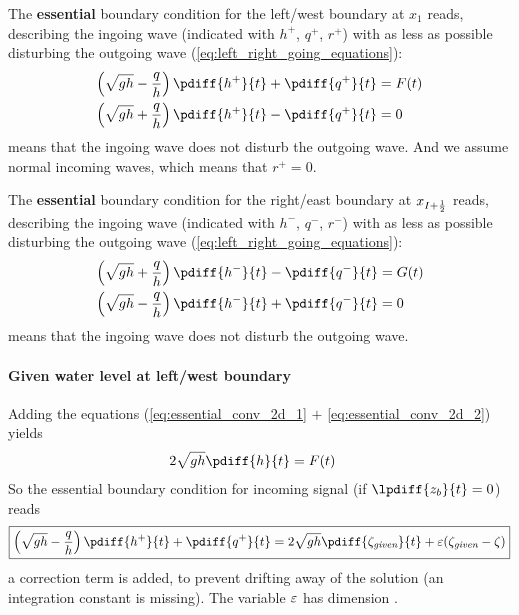 The \textbf{essential} boundary condition for the left/west boundary at $x_{1}$ reads, describing the ingoing wave (indicated with $h^+$, $q^+$, $r^+$) with as less as possible disturbing the outgoing wave (\autoref{eq:left_right_going_equations}):
\begin{align}
    \left(\sqrt{gh} - \frac{q}{h}\right) \pdiff{h^{+}}{t} + \pdiff{q^{+}}{t} & = F(t)
    \label{eq:essential_conv_2d_1}
    \\
    \left(\sqrt{gh} + \frac{q}{h}\right) \pdiff{h^{+}}{t} - \pdiff{q^{+}}{t} & = 0
    \label{eq:essential_conv_2d_2}
\end{align}
 means that the ingoing wave does not disturb the outgoing wave.
And we assume normal incoming waves, which means that $r^+=0$.

The \textbf{essential} boundary condition for the right/east boundary at $x_{I+\frac{1}{2}}$ reads, describing the ingoing wave (indicated with $h^-$, $q^-$, $r^-$) with as less as possible disturbing the outgoing wave (\autoref{eq:left_right_going_equations}):\begin{align}
    \left(\sqrt{gh} + \frac{q}{h}\right) \pdiff{h^{-}}{t} - \pdiff{q^{-}}{t} & = G(t)
    \label{eq:essential_conv_2d_3}
    \\
    \left(\sqrt{gh} - \frac{q}{h}\right) \pdiff{h^{-}}{t} + \pdiff{q^{-}}{t} & = 0
    \label{eq:essential_conv_2d_4}
\end{align}
 means that the ingoing wave does not disturb the outgoing wave.
\paragraph*{Given water level at left/west boundary}


Adding the equations (\eqref{eq:essential_conv_2d_1} $+$ \eqref{eq:essential_conv_2d_2}) yields
\begin{align}
    2 \sqrt{gh} \pdiff{h}{t} & = F(t)
\end{align}
%
So the essential boundary condition for incoming signal (if $\lpdiff{z_b}{t} = 0$) reads
\begin{align}
    {\boxed{
            \left(\sqrt{gh} - \frac{q}{h}\right) \pdiff{h^{+}}{t} + \pdiff{q^{+}}{t}  = 2 \sqrt{gh} \pdiff{\zeta_{\textit{given}}}{t}  + \eps(\zeta_{\textit{given}} - \zeta)
    }}\label{eq:essential_bc_2d_zeta}
\end{align}
a correction term is added, to prevent drifting away of the solution (an integration constant is missing).
The variable $\varepsilon$ has dimension \bunit{\metre\per\square\second}.

